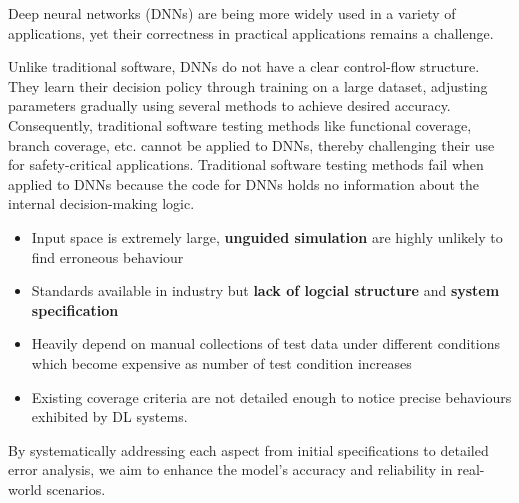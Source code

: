 \documentclass[10pt, conference, a4paper, final]{IEEEtran}
\begin{document}


Deep neural networks (DNNs) are being more widely used in a variety of applications, yet their correctness in practical applications remains a challenge.

Unlike traditional software, DNNs do not have a clear control-flow structure. They learn their decision policy through training on a large dataset, adjusting parameters gradually using several methods to achieve desired accuracy. Consequently, traditional software testing methods like functional coverage, branch coverage, etc. cannot be applied to DNNs, thereby challenging their use for safety-critical applications. Traditional software testing methods fail when applied to DNNs because the code for DNNs holds no information about the internal decision-making logic.

\begin{itemize}
\item Input space is extremely large, \textbf{unguided simulation} are highly unlikely to find erroneous behaviour
\item Standards available in industry but \textbf{lack of logcial structure} and \textbf{system specification}  
\item Heavily depend on manual collections of test data under different conditions which become expensive as number of test condition increases
\item  Existing coverage criteria are not detailed enough to notice precise behaviours exhibited by DL systems.
\end{itemize}


By systematically addressing each aspect from initial specifications to detailed error analysis, we aim to enhance the model's accuracy and reliability in real-world scenarios.
\end{document}
